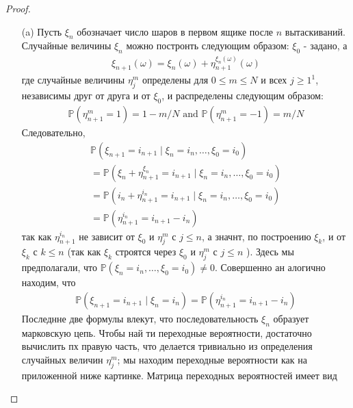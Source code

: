     \begin{proof}
    \begin{itemize}
    \item[(a)]
        Пусть $\xi_{n}$ обозначает число шаров в первом ящике после $n$ вытаскиваний. Случайные величины $\xi_{n}$ можно постронть следующим образом: $\xi_{0}$ - задано, а
        \begin{gather*}
            \xi_{n+1}(\omega)=\xi_{n}(\omega)+\eta_{n+1}^{\xi_{n}(\omega)}(\omega)
        \end{gather*}
        где случайные величины $\eta_{j}^{m}$ определены для $0 \leq m \leq N$ и всех $j \geq 1^{1}$, независимы друг от друга и от $\xi_{0}$, и распределены следующим образом:
        \begin{gather*}
            \mathbb{P}\left(\eta_{n+1}^{m}=1\right)=1-m / N \text { and } \mathbb{P}\left(\eta_{n+1}^{m}=-1\right)=m / N
        \end{gather*}
        Следовательно,
        \begin{gather*}
            \mathbb{P}\left(\xi_{n+1}=i_{n+1} \mid \xi_{n}=i_{n}, \ldots, \xi_{0}=i_{0}\right)\\
            =\mathbb{P}\left(\xi_{n}+\eta_{n+1}^{\xi_{n}}=i_{n+1} \mid \xi_{n}=i_{n}, \ldots, \xi_{0}=i_{0}\right)\\
            =\mathbb{P}\left(i_{n}+\eta_{n+1}^{i_{n}}=i_{n+1} \mid \xi_{n}=i_{n}, \ldots, \xi_{0}=i_{0}\right)\\
            =\mathbb{P}\left(\eta_{n+1}^{i_{n}}=i_{n+1}-i_{n}\right)
        \end{gather*}
        так как $\eta_{n+1}^{i_{n}}$ не зависит от $\xi_{0}$ и $\eta_{j}^{m}$ с $j \leq n$, а значнт, по построению $\xi_{k}$, и от $\xi_{k}$ с $k \leq n$ (так как $\xi_{k}$ строятся через $\xi_{0}$ и $\eta_{j}^{m}$ с $j \leq n$ ). Здесь мы предполагали, что $\mathbb{P}\left(\xi_{n}=i_{n}, \ldots, \xi_{0}=i_{0}\right) \neq 0$. Совершенно ан алогично находим, что
        \begin{gather*}
            \mathbb{P}\left(\xi_{n+1}=i_{n+1} \mid \xi_{n}=i_{n}\right)
            = \mathbb{P}\left(\eta_{n+1}^{i_{n}}=i_{n+1}-i_{n}\right)
        \end{gather*}
        Последнне две формулы влекут, что последовательность $\xi_{n}$ образует марковскую цепь. Чтобы най ти переходные вероятности, достаточно вычислить пх правую часть, что делается тривиально из определения случайных величин $\eta_{j}^{m}$; мы находим переходные вероятности как на приложенной ниже картинке. Матрица переходных вероятностей имеет вид

\end{itemize}
\end{proof}
